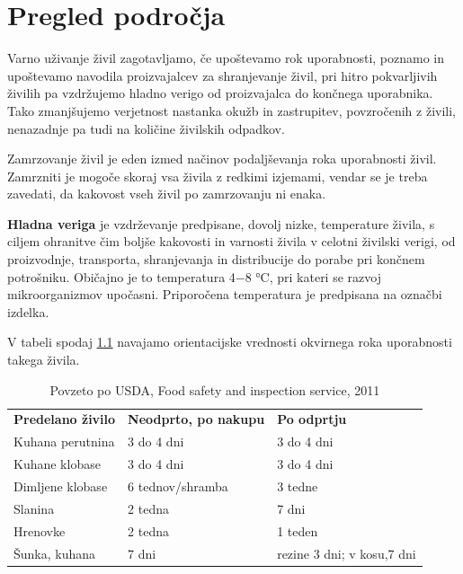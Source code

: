 \documentclass[a4paper, 12pt]{book}
\begin{document}
\chapter{Pregled področja}
\label{pregled-podrocja}
Varno uživanje živil zagotavljamo, če upoštevamo rok uporabnosti, poznamo in upoštevamo navodila proizvajalcev za shranjevanje živil, pri hitro pokvarljivih živilih pa vzdržujemo hladno verigo od proizvajalca do končnega uporabnika. Tako zmanjšujemo verjetnost nastanka okužb in zastrupitev, povzročenih z živili, nenazadnje pa tudi na količine živilskih odpadkov.

Zamrzovanje živil je eden izmed načinov podaljševanja roka uporabnosti živil. Zamrzniti je mogoče skoraj vsa živila z redkimi izjemami, vendar se je treba zavedati, da kakovost vseh živil po zamrzovanju ni enaka.

\textbf{Hladna veriga} je vzdrževanje predpisane, dovolj nizke, temperature živila, s ciljem ohranitve čim boljše kakovosti in varnosti živila v celotni živilski verigi, od proizvodnje, transporta, 
shranjevanja in distribucije do porabe pri končnem potrošniku. 
Običajno je to temperatura 4−8 °C, pri kateri se razvoj mikroorganizmov upočasni. Priporočena temperatura je predpisana na označbi izdelka. \cite{nijz-brosura-varnost}

V tabeli spodaj \ref{tab:food-safety-table} navajamo orientacijske vrednosti okvirnega roka uporabnosti takega živila.

\begin{table}[h]
\begin{tabular}{lll}
\textbf{Predelano živilo} & \textbf{Neodprto, po nakupu} & \textbf{Po odprtju}        \\
Kuhana perutnina          & 3 do 4 dni                   & 3 do 4 dni                 \\
Kuhane klobase            & 3 do 4 dni                   & 3 do 4 dni                 \\
Dimljene klobase          & 6 tednov/shramba             & 3 tedne                    \\
Slanina                   & 2 tedna                      & 7 dni                      \\
Hrenovke                  & 2 tedna                      & 1 teden                    \\
Šunka, kuhana             & 7 dni                        & rezine 3 dni; v kosu,7 dni
\end{tabular}
\caption{ Povzeto po USDA, Food safety and inspection service, 2011 }
\label{tab:food-safety-table}
\end{table}
\end{document}
